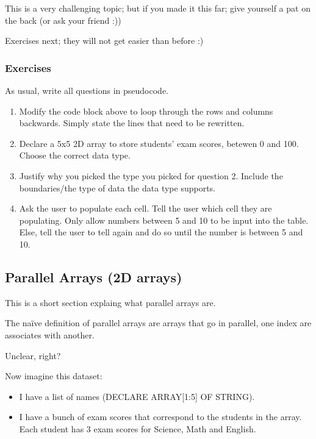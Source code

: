 \documentclass[./main.tex]{subfiles}
\begin{document}
This is a very challenging topic; but if you made it this far; give yourself a pat on the back (or ask your friend :))

Exercises next; they will not get easier than before :)

\newpage
\subsubsection{Exercises}

As usual, write all questions in pseudocode.

\begin{enumerate}
    \item Modify the code block above to loop through the rows and columns backwards. Simply state the lines that need to be rewritten.
        \mediumlines
    \item Declare a 5x5 2D array to store students' exam scores, betewen 0 and 100. Choose the correct data type.
        \mediumlines
    \item Justify why you picked the type you picked for question 2. Include the boundaries/the type of data the data type supports.
        \mediumlines
    \item Ask the user to populate each cell. Tell the user which cell they are populating. Only allow numbers between 5 and 10 to be input into the table. Else, tell the user to tell again and do so until the number is between 5 and 10.
        \verylargelines
\end{enumerate}

\subsection{Parallel Arrays (2D arrays)}

This is a short section explaing what parallel arrays are.

The naïve definition of parallel arrays are arrays that go in parallel, one index are associates with another.

Unclear, right?

Now imagine this dataset:

\begin{itemize}
    \item I have a list of names ({\ccmono DECLARE ARRAY[1:5] OF STRING}).
    \item I have a bunch of exam scores that correspond to the students in the array. Each student has 3 exam scores for Science, Math and English.
\end{itemize}
\end{document}
